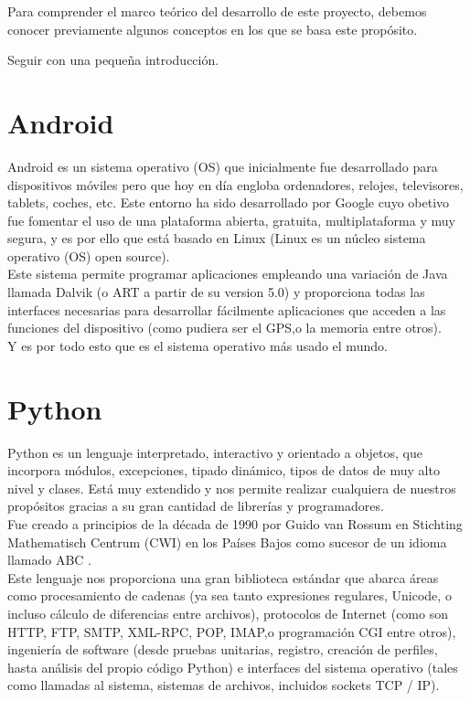 
Para comprender el marco teórico del desarrollo de este proyecto, debemos conocer previamente algunos conceptos en los que se basa este propósito.

Seguir con una pequeña introducción.


\section{Android}

Android \cite{book:android} es un sistema operativo (OS) que inicialmente fue desarrollado para dispositivos móviles pero que hoy en día engloba ordenadores, relojes, televisores, tablets, coches, etc. Este entorno ha sido desarrollado por Google cuyo obetivo fue fomentar el uso de una plataforma abierta, gratuita, multiplataforma y muy segura, y es por ello que está basado en Linux (Linux es un núcleo sistema operativo (OS) open source).\\
Este sistema permite programar aplicaciones empleando una variación de Java llamada Dalvik (o ART a partir de su version 5.0) y proporciona todas las interfaces necesarias para desarrollar fácilmente aplicaciones que acceden a las funciones del dispositivo (como pudiera ser el GPS,o la memoria entre otros).\\
Y es por todo esto que es el sistema operativo más usado el mundo.




\section{Python}

Python \cite{python} es un lenguaje interpretado, interactivo y orientado a objetos, que incorpora módulos, excepciones, tipado dinámico, tipos de datos de muy alto nivel y clases. Está muy extendido y nos permite realizar cualquiera de nuestros propósitos gracias a su gran cantidad de librerías y programadores. \\
Fue creado a principios de la década de 1990 por Guido van Rossum en Stichting Mathematisch Centrum (CWI) en los Países Bajos como sucesor de un idioma llamado ABC \cite{pythonhistory}. \\
Este lenguaje \cite{python} nos proporciona una gran biblioteca estándar que abarca áreas como procesamiento de cadenas (ya sea tanto expresiones regulares, Unicode, o incluso cálculo de diferencias entre archivos), protocolos de Internet (como son HTTP, FTP, SMTP, XML-RPC, POP, IMAP,o programación CGI entre otros), ingeniería de software (desde pruebas unitarias, registro, creación de perfiles, hasta análisis del propio código Python) e interfaces del sistema operativo (tales como llamadas al sistema, sistemas de archivos, incluidos sockets TCP / IP).



